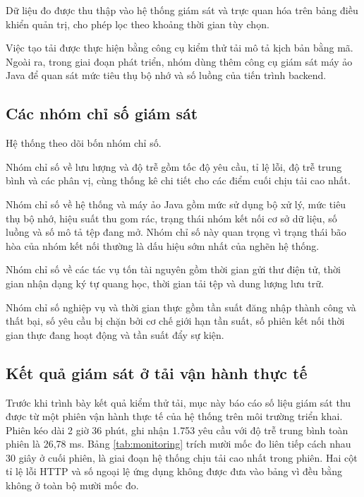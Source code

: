 \documentclass[12pt,a4paper,oneside]{report}
\begin{document}
Dữ liệu đo được thu thập vào hệ thống giám sát và trực quan hóa trên bảng điều khiển quản trị, cho phép lọc theo khoảng thời gian tùy chọn.

Việc tạo tải được thực hiện bằng công cụ kiểm thử tải mô tả kịch bản bằng mã. Ngoài ra, trong giai đoạn phát triển, nhóm dùng thêm công cụ giám sát máy ảo Java để quan sát mức tiêu thụ bộ nhớ và số luồng của tiến trình backend.

\subsection{Các nhóm chỉ số giám sát}

Hệ thống theo dõi bốn nhóm chỉ số.

Nhóm chỉ số về lưu lượng và độ trễ gồm tốc độ yêu cầu, tỉ lệ lỗi, độ trễ trung bình và các phân vị, cùng thống kê chi tiết cho các điểm cuối chịu tải cao nhất.

Nhóm chỉ số về hệ thống và máy ảo Java gồm mức sử dụng bộ xử lý, mức tiêu thụ bộ nhớ, hiệu suất thu gom rác, trạng thái nhóm kết nối cơ sở dữ liệu, số luồng và số mô tả tệp đang mở. Nhóm chỉ số này quan trọng vì trạng thái bão hòa của nhóm kết nối thường là dấu hiệu sớm nhất của nghẽn hệ thống.

Nhóm chỉ số về các tác vụ tốn tài nguyên gồm thời gian gửi thư điện tử, thời gian nhận dạng ký tự quang học, thời gian tải tệp và dung lượng lưu trữ.

Nhóm chỉ số nghiệp vụ và thời gian thực gồm tần suất đăng nhập thành công và thất bại, số yêu cầu bị chặn bởi cơ chế giới hạn tần suất, số phiên kết nối thời gian thực đang hoạt động và tần suất đẩy sự kiện.

\subsection{Kết quả giám sát ở tải vận hành thực tế}

Trước khi trình bày kết quả kiểm thử tải, mục này báo cáo số liệu giám sát thu được từ một phiên vận hành thực tế của hệ thống trên môi trường triển khai. Phiên kéo dài 2 giờ 36 phút, ghi nhận 1.753 yêu cầu với độ trễ trung bình toàn phiên là 26,78 ms. Bảng \ref{tab:monitoring} trích mười mốc đo liên tiếp cách nhau 30 giây ở cuối phiên, là giai đoạn hệ thống chịu tải cao nhất trong phiên. Hai cột tỉ lệ lỗi HTTP và số ngoại lệ ứng dụng không được đưa vào bảng vì đều bằng không ở toàn bộ mười mốc đo.
\end{document}
